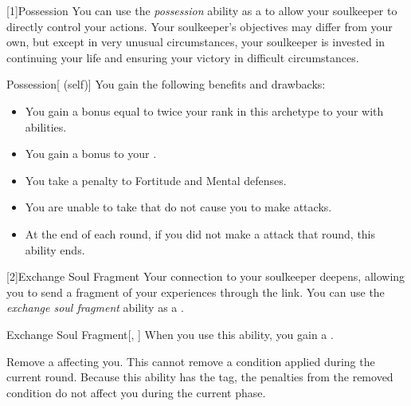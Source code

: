         [1]{Possession} You can use the \textit{possession} ability as a  to allow your soulkeeper to directly control your actions.
        Your soulkeeper's objectives may differ from your own, but except in very unusual circumstances, your soulkeeper is invested in continuing your life and ensuring your victory in difficult circumstances.
        \begin{attuneability}{Possession}[ (self)]
            You gain the following benefits and drawbacks:
            \begin{itemize}
                \item You gain a bonus equal to twice your rank in this archetype to your  with  abilities.
                \item You gain a  bonus to your .
                \item You take a  penalty to Fortitude and Mental defenses.
                \item You are unable to take  that do not cause you to make  attacks.
                \item At the end of each round, if you did not make a  attack that round, this ability ends.
            \end{itemize}
        \end{attuneability}

        [2]{Exchange Soul Fragment} Your connection to your soulkeeper deepens, allowing you to send a fragment of your experiences through the link.
        You can use the \textit{exchange soul fragment} ability as a .
        \begin{freeability}{Exchange Soul Fragment}[, ]
            When you use this ability, you gain a .

            Remove a  affecting you.
            This cannot remove a condition applied during the current round.
            Because this ability has the  tag, the penalties from the removed condition do not affect you during the current phase.
        \end{freeability}

